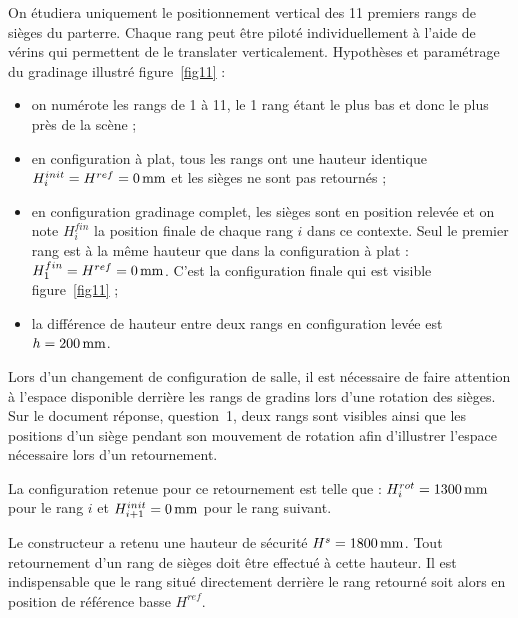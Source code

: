 On étudiera uniquement le positionnement vertical des 11 premiers rangs de sièges du parterre. Chaque rang peut être piloté individuellement à l'aide de vérins qui permettent de le translater verticalement. Hypothèses et paramétrage du gradinage illustré figure~\ref{fig11} :
\begin{itemize}
\item[---] on numérote les rangs de 1 à 11, le 1\ier{} rang étant le plus bas et donc le plus près de la scène ;
\item[---] en configuration à plat, tous les rangs ont une hauteur identique $H_i^{init}=H^{ref}=0\,\mathrm{mm}$ et les sièges ne sont pas retournés ;
\item[---] en configuration gradinage complet, les sièges sont en position relevée et on note $H_i^{fin}$ la position finale de chaque rang $i$ dans ce contexte. Seul le premier rang est à la même hauteur que dans la configuration à plat : $H_1^{fin}=H^{ref}=0\,\mathrm{mm}$. C'est la configuration finale qui est visible figure~\ref{fig11} ;
\item[---] la différence de hauteur entre deux rangs en configuration levée est $h=200\,\mathrm{mm}$.
\end{itemize}

Lors d'un changement de configuration de salle, il est nécessaire de faire attention à l'espace disponible derrière les rangs de gradins lors d'une rotation des sièges. Sur le document réponse, question~1, deux rangs sont visibles ainsi que les positions d'un siège pendant son mouvement de rotation afin d'illustrer l'espace nécessaire lors d'un retournement.

La configuration retenue pour ce retournement est telle que : $H_i^{rot}=1300\,\mathrm{mm}$ pour le rang $i$ et $H_{i+1}^{init}=0\,\mathrm{mm}$ pour le rang suivant.


Le constructeur a retenu une hauteur de sécurité $H^s=1800\,\mathrm{mm}$. Tout retournement d'un rang de sièges doit être effectué à cette hauteur. Il est indispensable que le rang situé directement derrière le rang retourné soit alors en position de référence basse $H^{ref}$.



